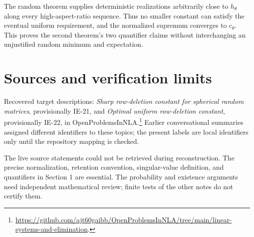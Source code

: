 \documentclass[11pt]{article}
\begin{document}
The random theorem supplies deterministic realizations arbitrarily close to $h_\theta$ along every high-aspect-ratio sequence. Thus no smaller constant can satisfy the eventual uniform requirement, and the normalized supremum converges to $c_\theta$. This proves the second theorem's two quantifier claims without interchanging an unjustified random minimum and expectation.
\section{Sources and verification limits}
Recovered target descriptions: \emph{Sharp row-deletion constant for spherical random matrices}, provisionally IE-21, and \emph{Optimal uniform row-deletion constant}, provisionally IE-22, in OpenProblemsInNLA.\footnote{\url{https://github.com/ajt60gaibb/OpenProblemsInNLA/tree/main/linear-systems-and-elimination}.} Earlier conversational summaries assigned different identifiers to these topics; the present labels are local identifiers only until the repository mapping is checked.

The live source statements could not be retrieved during reconstruction. The precise normalization, retention convention, singular-value definition, and quantifiers in Section 1 are essential. The probability and existence arguments need independent mathematical review; finite tests of the other notes do not certify them.
\end{document}
